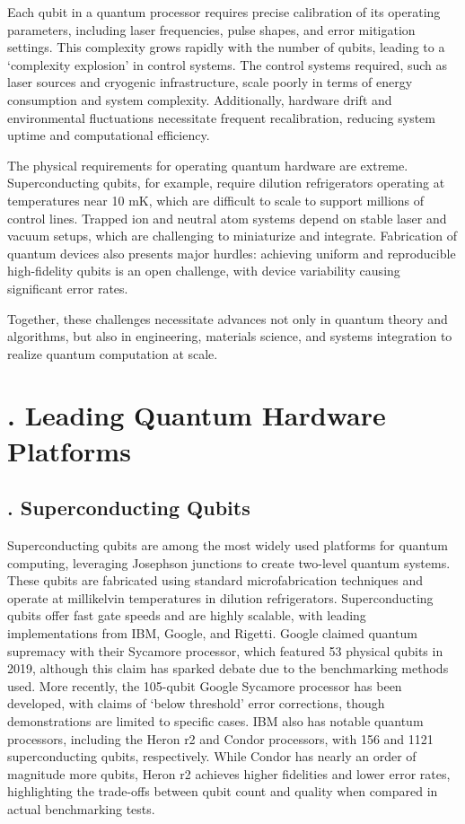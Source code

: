\documentclass{elbioimp2}
\begin{document}
Each qubit in a quantum processor requires precise calibration of its operating parameters, including laser frequencies, pulse shapes, and error mitigation settings. This complexity grows rapidly with the number of qubits, leading to a `complexity explosion' in control systems. The control systems required, such as laser sources and cryogenic infrastructure, scale poorly in terms of energy consumption and system complexity. Additionally, hardware drift and environmental fluctuations necessitate frequent recalibration, reducing system uptime and computational efficiency.

The physical requirements for operating quantum hardware are extreme. Superconducting qubits, for example, require dilution refrigerators operating at temperatures near 10 mK, which are difficult to scale to support millions of control lines. Trapped ion and neutral atom systems depend on stable laser and vacuum setups, which are challenging to miniaturize and integrate. Fabrication of quantum devices also presents major hurdles: achieving uniform and reproducible high-fidelity qubits is an open challenge, with device variability causing significant error rates.

Together, these challenges necessitate advances not only in quantum theory and algorithms, but also in engineering, materials science, and systems integration to realize quantum computation at scale.


\section{. Leading Quantum Hardware Platforms}
\subsection{. Superconducting Qubits}

Superconducting qubits are among the most widely used platforms for quantum computing, leveraging Josephson junctions to create two-level quantum systems. These qubits are fabricated using standard microfabrication techniques and operate at millikelvin temperatures in dilution refrigerators. Superconducting qubits offer fast gate speeds and are highly scalable, with leading implementations from IBM, Google, and Rigetti. Google claimed quantum supremacy with their Sycamore processor, which featured 53 physical qubits in 2019, although this claim has sparked debate due to the benchmarking methods used. More recently, the 105-qubit Google Sycamore processor has been developed, with claims of `below threshold' error corrections, though demonstrations are limited to specific cases\cite{google2025}. IBM also has notable quantum processors, including the Heron r2 and Condor processors, with 156 and 1121 superconducting qubits, respectively. While Condor has nearly an order of magnitude more qubits, Heron r2 achieves higher fidelities and lower error rates, highlighting the trade-offs between qubit count and quality when compared in actual benchmarking tests\cite{postquantum2024}.
\end{document}
